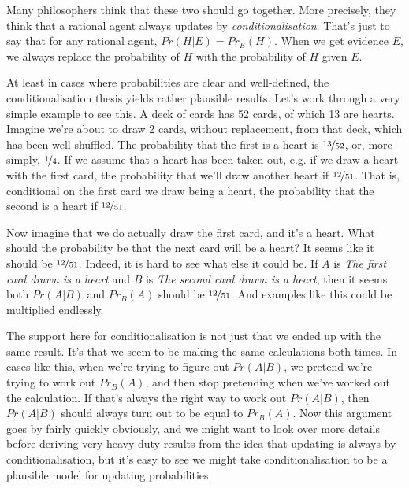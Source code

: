 Many philosophers think that these two should go together. More precisely, they think that a rational agent always updates by \textit{conditionalisation}. That's just to say that for any rational agent, $Pr(H | E) = Pr_{E}(H)$. When we get evidence $E$, we always replace the probability of $H$ with the probability of $H$ given $E$.

At least in cases where probabilities are clear and well-defined, the conditionalisation thesis yields rather plausible results. Let's work through a very simple example to see this. A deck of cards has 52 cards, of which 13 are hearts. Imagine we're about to draw 2 cards, without replacement, from that deck, which has been well-shuffled. The probability that the first is a heart is $\nicefrac{13}{52}$, or, more simply, $\nicefrac{1}{4}$. If we assume that a heart has been taken out, e.g. if we draw a heart with the first card, the probability that we'll draw another heart if $\nicefrac{12}{51}$. That is, conditional on the first card we draw being a heart, the probability that the second is a heart if $\nicefrac{12}{51}$.

Now imagine that we do actually draw the first card, and it's a heart. What should the probability be that the next card will be a heart? It seems like it should be $\nicefrac{12}{51}$. Indeed, it is hard to see what else it could be. If $A$ is \textit{The first card drawn is a heart} and $B$ is \textit{The second card drawn is a heart}, then it seems both $Pr(A | B)$ and $Pr_{B}(A)$ should be $\nicefrac{12}{51}$. And examples like this could be multiplied endlessly.

The support here for conditionalisation is not just that we ended up with the same result. It's that we seem to be making the same calculations both times. In cases like this, when we're trying to figure out $Pr(A | B)$, we pretend we're trying to work out $Pr_{B}(A)$, and then stop pretending when we've worked out the calculation. If that's always the right way to work out $Pr(A | B)$, then $Pr(A | B)$ should always turn out to be equal to $Pr_{B}(A)$. Now this argument goes by fairly quickly obviously, and we might want to look over more details before deriving very heavy duty results from the idea that updating is always by conditionalisation, but it's easy to see we might take conditionalisation to be a plausible model for updating probabilities.